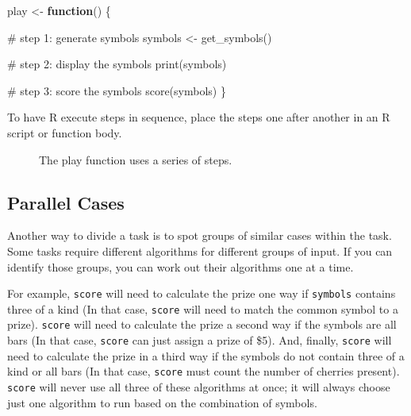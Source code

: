 \documentclass[
  letterpaper,
  DIV=11,
  numbers=noendperiod]{scrbook}
\makeatletter
\newenvironment{Shaded}{\begin{snugshade}}{\end{snugshade}}
\newcommand{\CommentTok}[1]{\textcolor[rgb]{0.37,0.37,0.37}{#1}}
\newcommand{\ControlFlowTok}[1]{\textcolor[rgb]{0.00,0.23,0.31}{\textbf{#1}}}
\newcommand{\FunctionTok}[1]{\textcolor[rgb]{0.28,0.35,0.67}{#1}}
\newcommand{\NormalTok}[1]{\textcolor[rgb]{0.00,0.23,0.31}{#1}}
\newcommand{\OtherTok}[1]{\textcolor[rgb]{0.00,0.23,0.31}{#1}}
\newcommand*\pandocbounded[1]{%
  \sbox\pandoc@box{#1}%
  \Gscale@div\@tempa{\textheight}{\dimexpr\ht\pandoc@box+\dp\pandoc@box\relax}%
  \Gscale@div\@tempb{\linewidth}{\wd\pandoc@box}%
  \ifdim\@tempb\p@<\@tempa\p@\let\@tempa\@tempb\fi%
  \ifdim\@tempa\p@<\p@\scalebox{\@tempa}{\usebox\pandoc@box}%
  \else\usebox{\pandoc@box}%
  \fi%
}
\makeatother
\begin{document}
\begin{Shaded}
\begin{Highlighting}[]
\NormalTok{play }\OtherTok{\textless{}{-}} \ControlFlowTok{function}\NormalTok{() \{}

  \CommentTok{\# step 1: generate symbols}
\NormalTok{  symbols }\OtherTok{\textless{}{-}} \FunctionTok{get\_symbols}\NormalTok{()}

  \CommentTok{\# step 2: display the symbols}
  \FunctionTok{print}\NormalTok{(symbols)}

  \CommentTok{\# step 3: score the symbols}
  \FunctionTok{score}\NormalTok{(symbols)}
\NormalTok{\}}
\end{Highlighting}
\end{Shaded}

To have R execute steps in sequence, place the steps one after another
in an R script or function body.

\begin{figure}

\centering{

\pandocbounded{\texttt{[image: images/hopr\_0701.png]}}

}

\caption{\label{fig-subdivide1}The play function uses a series of
steps.}

\end{figure}%

\subsection{Parallel Cases}\label{parallel-cases}

Another way to divide a task is to spot groups of similar cases within
the task. Some tasks require different algorithms for different groups
of input. If you can identify those groups, you can work out their
algorithms one at a time.

For example, \texttt{score} will need to calculate the prize one way if
\texttt{symbols} contains three of a kind (In that case, \texttt{score}
will need to match the common symbol to a prize). \texttt{score} will
need to calculate the prize a second way if the symbols are all bars (In
that case, \texttt{score} can just assign a prize of \$5). And, finally,
\texttt{score} will need to calculate the prize in a third way if the
symbols do not contain three of a kind or all bars (In that case,
\texttt{score} must count the number of cherries present).
\texttt{score} will never use all three of these algorithms at once; it
will always choose just one algorithm to run based on the combination of
symbols.
\end{document}
